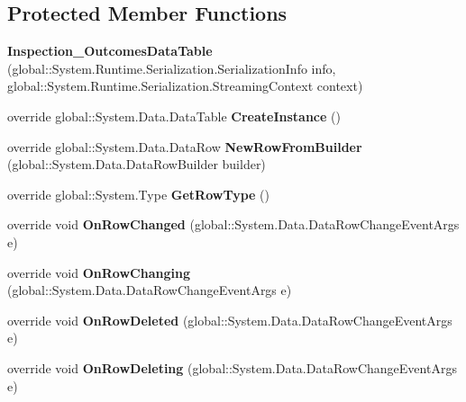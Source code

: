 \subsection*{Protected Member Functions}
\begin{DoxyCompactItemize}
\item 
\mbox{\label{class_a_f_h___scheduler_1_1_home_inspection_db_data_set_1_1_inspection___outcomes_data_table_a9a3b072d9f4162cdba9ed25636ebf13c}} 
{\bfseries Inspection\+\_\+\+Outcomes\+Data\+Table} (global\+::\+System.\+Runtime.\+Serialization.\+Serialization\+Info info, global\+::\+System.\+Runtime.\+Serialization.\+Streaming\+Context context)
\item 
\mbox{\label{class_a_f_h___scheduler_1_1_home_inspection_db_data_set_1_1_inspection___outcomes_data_table_a139bc3c8653f7342a26d55af77c3c8b5}} 
override global\+::\+System.\+Data.\+Data\+Table {\bfseries Create\+Instance} ()
\item 
\mbox{\label{class_a_f_h___scheduler_1_1_home_inspection_db_data_set_1_1_inspection___outcomes_data_table_ae7edd6bba366856fb73169d86715e4e4}} 
override global\+::\+System.\+Data.\+Data\+Row {\bfseries New\+Row\+From\+Builder} (global\+::\+System.\+Data.\+Data\+Row\+Builder builder)
\item 
\mbox{\label{class_a_f_h___scheduler_1_1_home_inspection_db_data_set_1_1_inspection___outcomes_data_table_a314743e9c76eeab96321bf3e2aaa96e9}} 
override global\+::\+System.\+Type {\bfseries Get\+Row\+Type} ()
\item 
\mbox{\label{class_a_f_h___scheduler_1_1_home_inspection_db_data_set_1_1_inspection___outcomes_data_table_a02e2772e7040e00faed32d98c0a3744f}} 
override void {\bfseries On\+Row\+Changed} (global\+::\+System.\+Data.\+Data\+Row\+Change\+Event\+Args e)
\item 
\mbox{\label{class_a_f_h___scheduler_1_1_home_inspection_db_data_set_1_1_inspection___outcomes_data_table_abab5ea7d8a0b77304355803c8e614df0}} 
override void {\bfseries On\+Row\+Changing} (global\+::\+System.\+Data.\+Data\+Row\+Change\+Event\+Args e)
\item 
\mbox{\label{class_a_f_h___scheduler_1_1_home_inspection_db_data_set_1_1_inspection___outcomes_data_table_a256534106e43308ddc4cb52081de1de6}} 
override void {\bfseries On\+Row\+Deleted} (global\+::\+System.\+Data.\+Data\+Row\+Change\+Event\+Args e)
\item 
\mbox{\label{class_a_f_h___scheduler_1_1_home_inspection_db_data_set_1_1_inspection___outcomes_data_table_a3f1645e50c56016c306c0ee3401ffecf}} 
override void {\bfseries On\+Row\+Deleting} (global\+::\+System.\+Data.\+Data\+Row\+Change\+Event\+Args e)
\end{DoxyCompactItemize}
